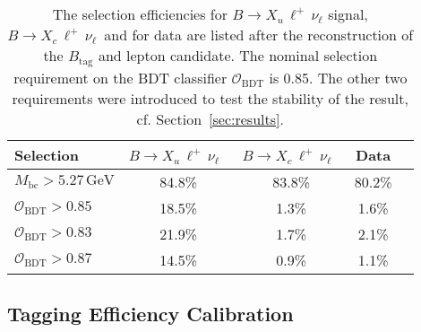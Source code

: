 \documentclass[twocolumn,aps,prd,superscriptaddress,nofootinbib,floatfix,preprintnumbers,a4]{revtex4-1}
\newcommand{\bulnu}{\ensuremath{B \to X_u \, \ell^+\, \nu_{\ell}}\xspace}
\newcommand{\bclnu}{\ensuremath{B \to X_c \, \ell^+\, \nu_{\ell}}\xspace}
\begin{document}
\begin{table}[t!]
\caption{
	The selection efficiencies for \bulnu signal, \bclnu\, and for data are listed after the reconstruction of the $B_{\mathrm{tag}}$ and lepton candidate. The nominal selection requirement on the BDT classifier $\mathcal{O}_{\mathrm{BDT}}$ is 0.85. The other two requirements were introduced to test the stability of the result, cf. Section~\ref{sec:results}.
}
\label{tab:sel}
\vspace{1ex}
\begin{tabular}{lcccc}
\hline\hline
  Selection & \bulnu\ & \bclnu\ & Data \\
 \hline
  $M_{\mathrm{bc}} > 5.27 \, \text{GeV}$& 84.8\% & 83.8\% & 80.2\% \\
  $\mathcal{O}_{\mathrm{BDT}}> 0.85$ & 18.5\% & 1.3\% & 1.6\%  \\ \hline
  $\mathcal{O}_{\mathrm{BDT}}> 0.83$ & 21.9\% & 1.7\% & 2.1\% \\ 
  $\mathcal{O}_{\mathrm{BDT}}> 0.87$ & 14.5\% & 0.9\% & 1.1\% \\ 
 \hline\hline
\end{tabular}
\end{table}

\subsection{Tagging Efficiency Calibration}\label{sec:tagg_eff_corr}
\end{document}
